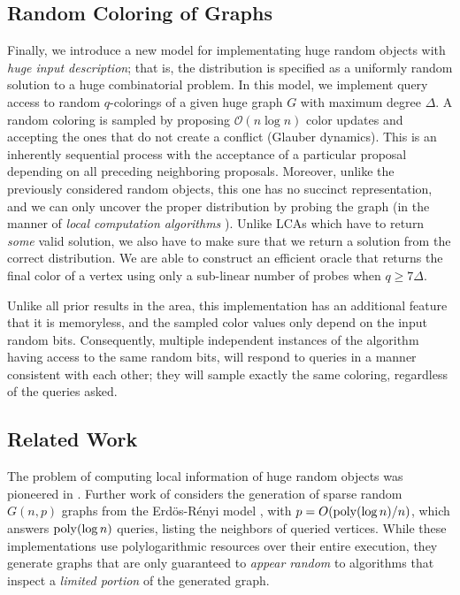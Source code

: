 \subsection{Random Coloring of Graphs}%
\label{sec:random_coloring_of_graphs}
Finally, we introduce a new model for implementating huge random objects with \emph{huge input description};
that is, the distribution is specified as a uniformly random solution to a huge combinatorial problem.
In this model, we implement query access to random $q$-colorings of a given huge graph $G$ with maximum degree $\Delta$.
A random coloring is sampled by proposing $\mathcal O(n\log n)$ color updates and accepting the ones that do not create a conflict (Glauber dynamics).
This is an inherently sequential process with the acceptance of a particular proposal depending on all preceding neighboring proposals.
Moreover, unlike the previously considered random objects, this one has no succinct representation, and we can only uncover the proper distribution
by probing the graph (in the manner of \emph{local computation algorithms} \cite{LCA, LCA_space_efficient}).
Unlike LCAs which have to return \emph{some} valid solution, we also have to make sure that we return a solution from the correct distribution.
We are able to construct an efficient oracle that returns the final color of a vertex using only a sub-linear number of probes when $q\ge 7\Delta$.

Unlike all prior results in the area, this implementation has an additional feature that it is memoryless,
and the sampled color values only depend on the input random bits.
Consequently, multiple independent instances of the algorithm having access to the same random bits,
will respond to queries in a manner consistent with each other; they will sample exactly the same coloring, regardless of the queries asked.




\subsection{Related Work}
\label{sec:related_work}
The problem of computing local information of huge random objects was pioneered in \cite{huge_old,huge}.
Further work of \cite{sparse} considers the generation of sparse random $G(n,p)$ graphs from the Erd\"{o}s-R\'{e}nyi model \cite{er},
with $p = O(\mathrm{poly}(\log n)/n)$, which answers $\mathrm{poly}(\log n)$  queries, listing the neighbors of queried vertices.
While these implementations use polylogarithmic resources over their entire execution,
they generate graphs that are  only guaranteed to \emph{appear random} to algorithms that inspect a \emph{limited portion} of the generated graph.

